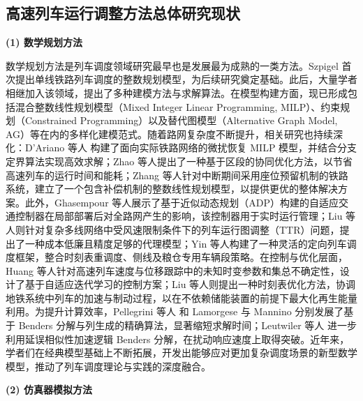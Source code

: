 \subsection{高速列车运行调整方法总体研究现状}

\textbf{(1) 数学规划方法}

数学规划方法是列车调度领域研究最早也是发展最为成熟的一类方法。Szpigel 首次提出单线铁路列车调度的整数规划模型，为后续研究奠定基础\cite{Szpigel1973}。此后，大量学者相继加入该领域，提出了多种建模方法与求解算法。在模型构建方面，现已形成包括混合整数线性规划模型（Mixed Integer Linear Programming, MILP）\cite{earl2005iterative,birgin2014milp,yao2023novel,meng2023milp}、约束规划（Constrained Programming）\cite{chen2024data,wang2022adaptive,rossi2008constraint,li2008chance}以及替代图模型（Alternative Graph Model, AG）\cite{ruiz2017alternative,zhang2022graph,robins2010alternative}等在内的多样化建模范式。随着路网复杂度不断提升，相关研究也持续深化：D’Ariano 等人 \cite{DAriano2007} 构建了面向实际铁路网络的微扰恢复 MILP 模型，并结合分支定界算法实现高效求解；Zhao 等人\cite{Zhao2020}提出了一种基于区段的协同优化方法，以节省高速列车的运行时间和能耗；Zhang 等人\cite{Zhang2023}针对中断期间采用座位预留机制的铁路系统，建立了一个包含补偿机制的整数线性规划模型，以提供更优的整体解决方案。此外，Ghasempour 等人\cite{Ghasempour2020}展示了基于近似动态规划（ADP）构建的自适应交通控制器在局部部署后对全路网产生的影响，该控制器用于实时运行管理；Liu 等人\cite{Liu2024}则针对复杂多线网络中受风速限制条件下的列车运行图调整（TTR）问题，提出了一种成本低廉且精度足够的代理模型；Yin 等人\cite{Yin2023}构建了一种灵活的定向列车调度框架，整合时刻表重调度、侧线及粮仓专用车辆段策略。在控制与优化层面，Huang 等人\cite{Huang2021}针对高速列车速度与位移跟踪中的未知时变参数和集总不确定性，设计了基于自适应迭代学习的控制方案；Liu 等人\cite{Liu2019}则提出一种时刻表优化方法，协调地铁系统中列车的加速与制动过程，以在不依赖储能装置的前提下最大化再生能量利用。为提升计算效率，Pellegrini 等人 \cite{Pellegrini2014} 和 Lamorgese 与 Mannino \cite{Lamorgese2015} 分别发展了基于 Benders 分解与列生成的精确算法，显著缩短求解时间；Leutwiler 等人 \cite{Leutwiler2023} 进一步利用延误相似性加速逻辑 Benders 分解，在扰动响应速度上取得突破。近年来，学者们在经典模型基础上不断拓展，开发出能够应对更加复杂调度场景的新型数学模型，推动了列车调度理论与实践的深度融合。


\textbf{(2) 仿真器模拟方法}

